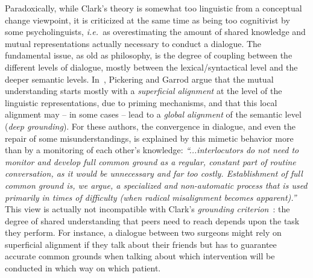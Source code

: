 \documentclass{sig-alternate}
\newcommand{\ie}{{\textit{i.e.~}}}
\begin{document}
Paradoxically, while Clark's theory is somewhat too linguistic from a conceptual
change viewpoint, it is criticized at the same time as being too cognitivist by
some psycholinguists, \ie as overestimating the amount of shared knowledge and
mutual representations actually necessary to conduct a dialogue. The fundamental
issue, as old as philosophy, is the degree of coupling between the different
levels of dialogue, mostly between the lexical/syntactical level and the deeper
semantic levels. In~\cite{pickering2006alignment}, Pickering and Garrod argue
that the mutual understanding starts mostly with a \emph{superficial alignment}
at the level of the linguistic representations, due to priming mechanisms, and
that this local alignment may -- in some cases -- lead to a \emph{global
alignment} of the semantic level (\emph{deep grounding}).  For these authors,
the convergence in dialogue, and even the repair of some misunderstandings, is
explained by this mimetic behavior more than by a monitoring of each other's
knowledge: \emph{``...interlocutors do not need to monitor and develop full common
ground as a regular, constant part of routine conversation, as it would be
unnecessary and far too costly. Establishment of full common ground is, we
argue, a specialized and non-automatic process that is used primarily in times
of difficulty (when radical misalignment becomes
apparent).''}~\cite{pickering2006alignment} This view is
actually not incompatible with Clark's \emph{grounding
criterion}~\cite{clark1989contributing}: the degree of shared understanding that
peers need to reach depends upon the task they perform. For instance, a dialogue
between two surgeons might rely on superficial alignment if they talk about
their friends but has to guarantee accurate common grounds when talking about
which intervention will be conducted in which way on which patient.

\end{document}
